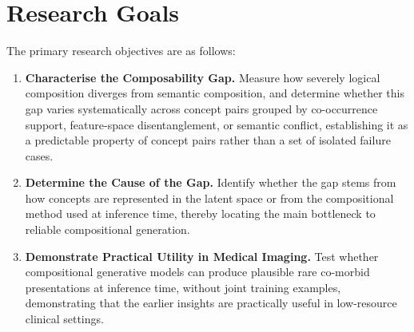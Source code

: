 
\section{Research Goals}
\label{sec:research_objectives_research_goal}

The primary research objectives are as follows:

\begin{enumerate}

    \item \textbf{Characterise the Composability Gap.}
    Measure how severely logical composition diverges from semantic composition, and determine whether this gap varies systematically across concept pairs grouped by co-occurrence support, feature-space disentanglement, or semantic conflict, establishing it as a predictable property of concept pairs rather than a set of isolated failure cases.

    \item \textbf{Determine the Cause of the Gap.}
    Identify whether the gap stems from how concepts are represented in the latent space or from the compositional method used at inference time, thereby locating the main bottleneck to reliable compositional generation.

    \item \textbf{Demonstrate Practical Utility in Medical Imaging.}
    Test whether compositional generative models can produce plausible rare co-morbid presentations at inference time, without joint training examples, demonstrating that the earlier insights are practically useful in low-resource clinical settings.

\end{enumerate}
